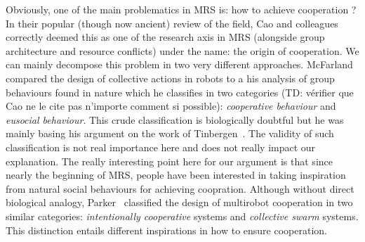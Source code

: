 
    Obviously, one of the main problematics in MRS is: how to achieve cooperation ? In their popular (though now ancient) review of the field, Cao and colleagues~\cite{Cao1997} correctly deemed this as one of the research axis in MRS (alongside group architecture and resource conflicts) under the name: the origin of cooperation. We can mainly decompose this problem in two very different approaches. McFarland~\cite{McFarland1996} compared the design of collective actions in robots to a his analysis of group behaviours found in nature which he classifies in two categories (TD: vérifier que Cao ne le cite pas n'importe comment si possible): \emph{cooperative behaviour} and \emph{eusocial behaviour}. This crude classification is biologically doubtful but he was mainly basing his argument on the work of Tinbergen~\cite{Tinbergen1953}. The validity of such classification is not real importance here and does not really impact our explanation. The really interesting point here for our argument is that since nearly the beginning of MRS, people have been interested in taking inspiration from natural social behaviours for achieving coopration. Although without direct biological analogy, Parker~\cite{Parker2008} classified the design of multirobot cooperation in two similar categories: \emph{intentionally cooperative} systems and \emph{collective swarm} systems. This distinction entails different inspirations in how to ensure cooperation.

